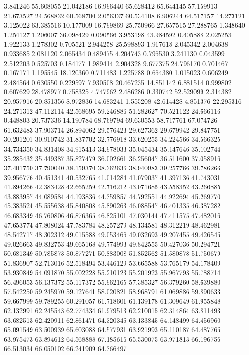 3.841246
55.608055
21.042186
16.996440
65.628412
65.644145
57.159913
21.673527
24.568832
60.568700
2.056337
60.534108
6.906244
64.517157
14.273121
3.125022
63.385516
10.177009
16.799869
25.750966
27.657515
27.288765
1.348640
1.254127
1.206007
36.098429
0.090566
3.953198
43.984592
0.405888
2.025253
1.922133
1.278302
0.705521
2.944258
25.598893
1.917618
2.045342
2.004638
0.933685
2.081120
2.065434
0.489475
4.204743
0.796530
3.241130
0.043599
2.512203
0.525703
0.184177
1.989414
2.904328
9.677375
24.796170
0.701467
0.167171
1.195545
18.120360
0.711483
1.225788
0.664380
1.015023
0.606249
2.484564
0.630550
0.229597
7.930508
20.467235
14.851142
6.881514
0.999802
0.607629
28.478977
0.758325
4.747962
2.486286
0.330742
52.529099
2.314382
20.957916
20.851356
8.972836
14.683241
1.555208
42.614428
4.851376
22.295316
24.271312
47.112114
42.568695
59.246886
51.282627
70.521122
24.666116
0.448803
20.737336
14.190784
68.769794
69.630553
58.717761
67.074726
61.632483
37.903714
26.894062
29.576423
29.627362
29.679942
29.847751
30.201201
30.910742
31.837702
32.776918
33.620255
34.224566
34.566325
34.734350
34.831408
34.915413
34.978033
35.045434
35.147646
35.102744
35.285432
35.449387
35.827479
36.002661
36.256047
36.511600
37.058916
37.401750
37.790040
38.159370
38.362636
38.940983
39.257766
39.786266
39.956776
40.451341
40.532765
41.014284
41.079037
41.397136
41.743031
41.894266
42.383428
42.665259
42.716212
43.071685
43.558352
43.266885
43.883957
44.089584
44.193836
44.359857
44.792551
44.922694
45.269770
45.383524
45.555638
45.840808
45.890263
46.088547
46.401335
46.387282
46.683349
46.760806
46.876365
46.825101
47.030144
47.411575
47.482016
47.653774
47.808024
47.783784
48.257279
48.134581
48.312219
48.462981
48.542717
48.302312
49.015588
49.053466
49.032693
49.207455
49.426545
49.026663
49.832753
49.665168
49.774993
49.842555
50.427036
50.294721
50.681349
50.785873
50.877271
50.883008
51.852562
51.580878
51.750679
51.836907
52.713016
52.518494
53.446129
53.665588
53.765179
54.178409
53.930849
54.091870
55.002228
55.210123
55.201923
55.967793
55.788714
56.496053
56.137372
55.117372
55.962165
57.385327
56.379260
58.639880
57.542250
59.245970
59.127641
58.020821
58.968791
61.069886
59.890633
59.667999
59.789255
60.291057
61.718601
61.139178
61.309649
61.955848
62.132991
62.245543
62.774334
61.979513
62.210015
62.314864
63.811493
63.682513
62.420911
62.861471
64.320345
63.133845
64.148499
64.456960
65.091549
63.500939
65.603088
64.577931
63.921993
65.110187
64.487765
63.975473
63.894612
64.568888
67.185616
65.530075
63.971813
66.196756
66.513034
66.050102
66.241909
64.366497
